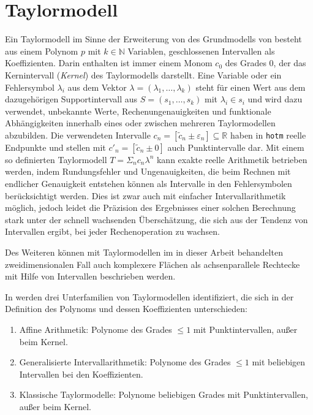 
\section{Taylormodell}
Ein Taylormodell im Sinne der Erweiterung von \cite{DBLP:conf/macis/BrausseKM15} des Grundmodells von \cite{makino2001} besteht aus einem Polynom $p$ mit $k\in \mathbb{N}$ Variablen, geschlossenen Intervallen als Koeffizienten. Darin enthalten ist immer einem Monom $c_0$ des Grades 0, der das Kernintervall (\textit{Kernel}) des Taylormodells darstellt. Eine Variable oder ein Fehlersymbol $\lambda_i$ aus dem Vektor $\lambda = (\lambda_1, \dots, \lambda_k)$ steht für einen Wert aus dem dazugehörigen Supportintervall aus $S=(s_1, \dots, s_k)$ mit $\lambda_i \in s_i$ und wird dazu verwendet, unbekannte Werte, Rechenungenauigkeiten und funktionale Abhängigkeiten innerhalb eines oder zwischen mehreren Taylormodellen abzubilden. Die verwendeten Intervalle $c_n = [\tilde{c}_n \pm \varepsilon_n] \subseteq \mathbb{R}$ haben in \verb+hotm+ reelle Endpunkte und stellen mit $c'_n = [\tilde{c}_n \pm 0]$ auch Punktintervalle dar. Mit einem so definierten Taylormodell $T=\Sigma_n c_n \lambda^n$ kann exakte reelle Arithmetik betrieben werden, indem Rundungsfehler und Ungenauigkeiten, die beim Rechnen mit endlicher Genauigkeit entstehen können als Intervalle in den Fehlersymbolen berücksichtigt werden. Dies ist zwar auch mit einfacher Intervallarithmetik möglich, jedoch leidet die Präzision des Ergebnisses einer solchen Berechnung stark unter der schnell wachsenden Überschätzung, die sich aus der Tendenz von Intervallen ergibt, bei jeder Rechenoperation zu wachsen.

Des Weiteren können mit Taylormodellen im in dieser Arbeit behandelten zweidimensionalen Fall auch komplexere Flächen als achsenparallele Rechtecke mit Hilfe von Intervallen beschrieben werden.


In \cite{DBLP:conf/macis/BrausseKM15} werden drei Unterfamilien von Taylormodellen identifiziert, die sich in der Definition des Polynoms und dessen Koeffizienten unterschieden:
\begin{enumerate}
 \item Affine Arithmetik: Polynome des Grades $\leq 1$ mit Punktintervallen, außer beim Kernel.
 \item Generalisierte Intervallarithmetik: Polynome des Grades $\leq 1$ mit beliebigen Intervallen bei den Koeffizienten. \label{tm2}
 \item Klassische Taylormodelle: Polynome beliebigen Grades mit Punktintervallen, außer beim Kernel. \label{tm3}
\end{enumerate}

